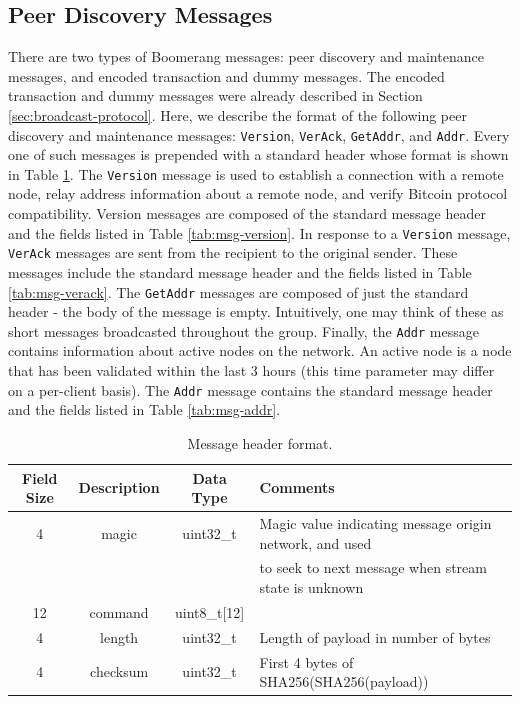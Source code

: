 \subsection{Peer Discovery Messages}
There are two types of Boomerang messages: peer discovery and maintenance messages, and encoded transaction and dummy messages. The encoded transaction and dummy messages were already described in Section \ref{sec:broadcast-protocol}. Here, we describe the format of the following peer discovery and maintenance messages: {\tt Version}, {\tt VerAck}, {\tt GetAddr}, and {\tt Addr}. Every one of such messages is prepended with a standard header whose format is shown in Table \ref{tab:msg-header}. The {\tt Version} message is used to establish a connection with a remote node, relay address information about a remote node, and verify Bitcoin protocol compatibility. Version messages are composed of the standard message header and the fields listed in Table \ref{tab:msg-version}. In response to a {\tt Version} message, {\tt VerAck} messages are sent from the recipient to the original sender. These messages include the standard message header and the fields listed in Table \ref{tab:msg-verack}. The {\tt GetAddr} messages are composed of just the standard header - the body of the message is empty. Intuitively, one may think of these as short messages broadcasted throughout the group. Finally, the {\tt Addr} message contains information about active nodes on the network. An active node is a node that has been validated within the last 3 hours (this time parameter may differ on a per-client basis). The {\tt Addr} message contains the standard message header and the fields listed in Table \ref{tab:msg-addr}. 

\begin{table}
\begin{center}
\caption{Message header format.}
\label{tab:msg-header}
    \begin{tabular}{|c|c|c|l|} \hline
    \textbf{Field Size} & {\bf Description} & {\bf Data Type} & {\bf Comments} \\ \hline
    4 & magic & uint32\_t & Magic value indicating message origin network, and used \\
    ~ & ~ & ~ & to seek to next message when stream state is unknown \\
    12 & command & uint8\_t[12] & ~ \\
    4 & length & uint32\_t & Length of payload in number of bytes \\
    4 & checksum & uint32\_t & First 4 bytes of SHA256(SHA256(payload)) \\ \hline
    \end{tabular}
\end{center}
\end{table}

